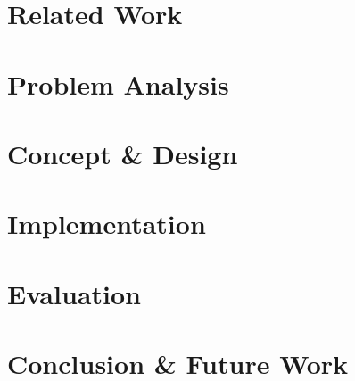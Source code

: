 \documentclass[12pt,a4paper,twoside]{report}
\theoremstyle{definition}
\begin{document}
\chapter{Related Work}
\label{ch:related_work}  	
	
\cleardoublepage    

\chapter{Problem Analysis}
\label{ch:problem_analysis}   
  		
  		
\chapter{Concept \& Design}
\label{ch:concept_design}  
	
\cleardoublepage    

\chapter{Implementation}
\label{ch:implementation}  

\cleardoublepage    

\chapter{Evaluation}
\label{ch:evaluation}  
	
\cleardoublepage  

\chapter{Conclusion \& Future Work}
\label{ch:conclusion_future_work}  
	
\cleardoublepage  

    
\nocite{*}


		
\cleardoublepage



\begin{appendices}
	
	\cleardoublepage
\end{appendices}

\listoftables
\cleardoublepage
\listoffigures
\cleardoublepage
\printindex
\cleardoublepage
\end{document}

